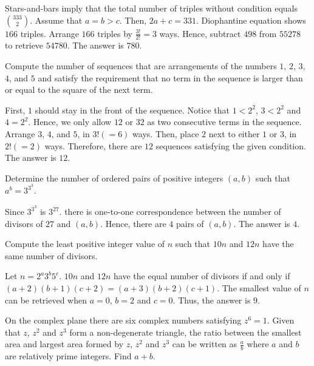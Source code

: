 \begin{solution}
Stars-and-bars imply that the total number of triples without condition equals $\binom{333}{2}$. Assume that $a=b>c$. Then, $2a+c=331$. Diophantine equation shows $166$ triples. Arrange $166$ triples by $\frac{3!}{2!}=3$ ways. Hence, subtract $498$ from $55278$ to retrieve $54780$. The answer is $780$.
\end{solution}

\begin{problem}
Compute the number of sequences that are arrangements of the numbers $1$, $2$, $3$, $4$, and $5$ and satisfy the requirement that no term in the sequence is larger than or equal to the square of the next term.
\end{problem}

\begin{solution}
First, $1$ should stay in the front of the sequence. Notice that $1<2^2$, $3<2^2$ and $4=2^2$. Hence, we only allow $12$ or $32$ as two consecutive terms in the sequence. Arrange $3$, $4$, and $5$, in $3!(=6)$ ways. Then, place $2$ next to either $1$ or $3$, in $2!(=2)$ ways. Therefore, there are $12$ sequences satisfying the given condition. The answer is $12$.
\end{solution}

\begin{problem}
Determine the number of ordered pairs of positive integers $(a,b)$ such that $a^b=3^{3^3}$.
\end{problem}

\begin{solution}
Since $3^{3^3}$ is $3^{27}$. there is one-to-one correspondence between the number of divisors of $27$ and $(a,b)$. Hence, there are $4$ pairs of $(a,b)$. The answer is $4$.
\end{solution}

\begin{problem}
Compute the least positive integer value of $n$ such that $10n$ and $12n$ have the same number of divisors.
\end{problem}

\begin{solution}
Let $n=2^a3^b5^c$. $10n$ and $12n$ have the equal number of divisors if and only if $(a+2)(b+1)(c+2)=(a+3)(b+2)(c+1)$. The smallest value of $n$ can be retrieved when $a=0$, $b=2$ and $c=0$. Thus, the answer is $9$.
\end{solution}

\begin{problem}
On the complex plane there are six complex numbers satisfying $z^6=1$. Given that $z$, $z^2$ and $z^3$ form a non-degenerate triangle, the ratio between the smallest area and largest area formed by $z$, $z^2$ and $z^3$ can be written as $\frac{a}{b}$ where $a$ and $b$ are relatively prime integers. Find $a+b$.
\end{problem}

